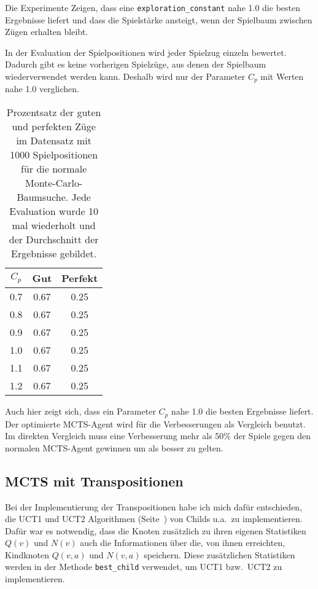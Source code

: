 Die Experimente Zeigen, dass eine \verb|exploration_constant| nahe 1.0 die besten Ergebnisse liefert und dass die Spielstärke ansteigt, wenn der Spielbaum zwischen Zügen erhalten bleibt.

In der Evaluation der Spielpositionen wird jeder Spielzug einzeln bewertet.
Dadurch gibt es keine vorherigen Spielzüge, aus denen der Spielbaum wiederverwendet werden kann.
Deshalb wird nur der Parameter $C_p$ mit Werten nahe 1.0 verglichen.

\begin{table}[h!]
\centering
\begin{tabular}{ |c||c|c| }
 \hline
 $C_p$ & Gut & Perfekt \\
 \hline
 0.7 & 0.67 & 0.25 \\
 \hline
 0.8 & 0.67 & 0.25 \\
 \hline
 0.9 & 0.67 & 0.25 \\
 \hline
 1.0 & 0.67 & 0.25 \\
 \hline
 1.1 & 0.67 & 0.25 \\
 \hline
 1.2 & 0.67 & 0.25 \\
 \hline
\end{tabular}
\caption{Prozentsatz der guten und perfekten Züge im Datensatz mit 1000 Spielpositionen für die normale Monte-Carlo-Baumsuche. Jede Evaluation wurde 10 mal wiederholt und der Durchschnitt der Ergebnisse gebildet.}
\label{tab:move-evaluation-mcts}
\end{table}

Auch hier zeigt sich, dass ein Parameter $C_p$ nahe 1.0 die besten Ergebnisse liefert.
Der optimierte MCTS-Agent wird für die Verbesserungen als Vergleich benutzt.
Im direkten Vergleich muss eine Verbesserung mehr als 50\% der Spiele gegen den normalen MCTS-Agent gewinnen um als besser zu gelten.

\subsection{MCTS mit Transpositionen}
\label{subsec:mcts-mit-transpositionen}

Bei der Implementierung der Transpositionen habe ich mich dafür entschieden, die UCT1 und UCT2 Algorithmen (Seite~\pageref{eqn:UCT1}) von Childs u.a.\ zu implementieren.
Dafür war es notwendig, dass die Knoten zusätzlich zu ihren eigenen Statistiken $Q(v)$ und $N(v)$ auch die Informationen über die, von ihnen erreichten, Kindknoten $Q(v,a)$ und $N(v,a)$ speichern.
Diese zusätzlichen Statistiken werden in der Methode \verb|best_child| verwendet, um UCT1 bzw.\ UCT2 zu implementieren.

